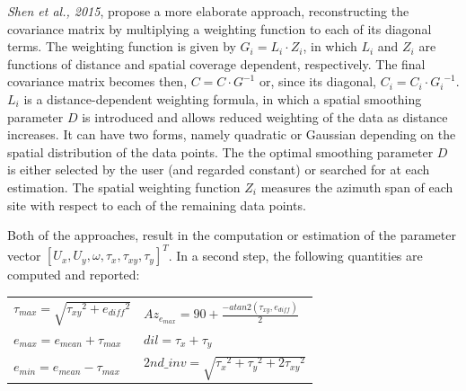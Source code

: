\documentclass[landscape,a0paper,fontscale=0.328]{baposter} %
\begin{document}
\begin{poster}
{%
% 

\textit{Shen et al., 2015}, propose a more elaborate approach, reconstructing the
covariance matrix by multiplying a weighting function to each of its diagonal terms.
The weighting function is given by \(G_i = L_i \cdot Z_i\), in which \(L_i\) and \(Z_i\)
are functions of distance and spatial coverage dependent, respectively.
The final covariance matrix becomes then, \(C = C \cdot G^{-1}\) or, since its diagonal,
\(C_i = C_i \cdot {G_i}^{-1}\).
\(L_i\) is a distance-dependent weighting formula, in which a spatial smoothing 
parameter \(D\) is introduced and allows reduced weighting of the data as distance 
increases. It can have two forms, namely quadratic or Gaussian depending on the
spatial distribution of the data points. The the optimal smoothing parameter \(D\) 
is either selected by the user (and regarded constant) or searched for at each 
estimation.
The spatial weighting function \(Z_i\) measures the azimuth span of each site 
with respect to each of the remaining data points.

Both of the approaches, result in the computation or estimation of the parameter vector 
\([U_{x}, U_{y}, \omega, \tau_{x}, \tau_{xy}, \tau_{y}]^T\). In a second step, the
following quantities are computed and reported:

\begin{tabular}{l l}
$ \tau_{max}= \sqrt{ {\tau_{xy}}^2 + {e_{diff}}^2 } $ &$ Az_{e_{max}}  = 90 + \frac{-atan2(\tau_{xy}, e_{diff})}{2} $\\
 $ e_{max}  = e_{mean} + \tau_{max} $ & $ dil = \tau_{x} + \tau_{y} $ \\
  $ e_{min}  = e_{mean} - \tau_{max} $ & $ 2nd\_inv = \sqrt{ {\tau_{x}}^2 + {\tau_{y}}^2 + 2{\tau_{xy}}^2  }$\\


\end{tabular}}
\end{poster}
\end{document}
